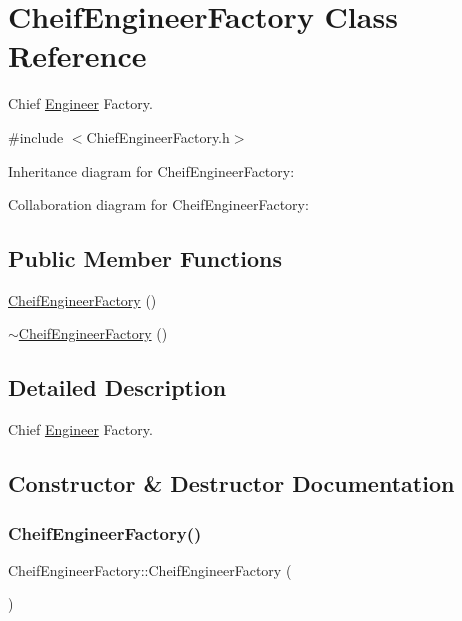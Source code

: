 \hypertarget{classCheifEngineerFactory}{}\section{Cheif\+Engineer\+Factory Class Reference}
\label{classCheifEngineerFactory}


Chief \hyperlink{classEngineer}{Engineer} Factory.  




{\ttfamily \#include $<$Chief\+Engineer\+Factory.\+h$>$}



Inheritance diagram for Cheif\+Engineer\+Factory\+:


Collaboration diagram for Cheif\+Engineer\+Factory\+:
\subsection*{Public Member Functions}
\begin{DoxyCompactItemize}
\item 
\hyperlink{classCheifEngineerFactory_aa3b45f6d06a640bc77086f58ccffe650}{Cheif\+Engineer\+Factory} ()
\item 
\hyperlink{classCheifEngineerFactory_ac6c5623874406c88cd34badb6294c998}{$\sim$\+Cheif\+Engineer\+Factory} ()
\end{DoxyCompactItemize}


\subsection{Detailed Description}
Chief \hyperlink{classEngineer}{Engineer} Factory. 

\subsection{Constructor \& Destructor Documentation}
\mbox{\label{classCheifEngineerFactory_aa3b45f6d06a640bc77086f58ccffe650}} 
\subsubsection{\texorpdfstring{Cheif\+Engineer\+Factory()}{CheifEngineerFactory()}}
{\footnotesize\ttfamily Cheif\+Engineer\+Factory\+::\+Cheif\+Engineer\+Factory (\begin{DoxyParamCaption}{ }\end{DoxyParamCaption})}

